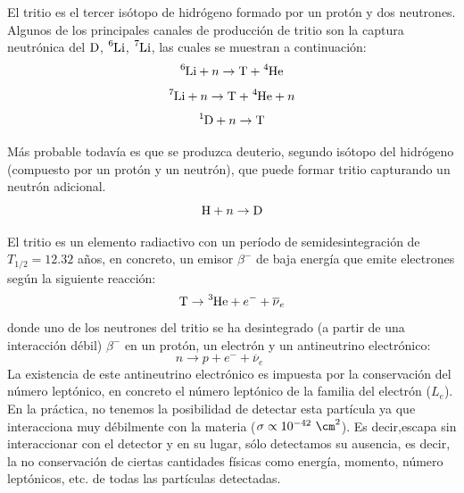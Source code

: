 El tritio  es el tercer isótopo de hidrógeno formado por un protón y dos neutrones. Algunos de los principales canales de producción de tritio son la captura neutrónica del $\ce{D}$, $\ce{^6Li}$, $\ce{^7Li}$,  las cuales se muestran a continuación:
\begin{equation}
\ce{^{6}Li} + n \rightarrow \ce{T} + \ce{^{4}He}
\label{capneuLi6}
\end{equation}
\begin{equation}
\ce{^{7}Li} + n \rightarrow  \ce{T} + \ce{^{4}He} + n
\label{capneuLi7}
\end{equation}
\begin{equation}
\ce{^{1}D} + n \rightarrow  \ce{T}  
\label{capneuH}
\end{equation}

Más probable todavía es que se produzca deuterio, segundo isótopo del hidrógeno (compuesto por un protón y un neutrón), que puede formar tritio capturando un neutrón adicional. 
\begin{equation}
\ce{H} + n \rightarrow  \ce{D}  
\label{capneuD}
\end{equation}


El tritio es  un elemento radiactivo con un período de semidesintegración de $T_{1/2}=12.32$ años, en concreto, un emisor $\beta^-$ de baja energía que emite electrones según la siguiente reacción:
\begin{equation}
\ce{T} \rightarrow \ce{^{3}He} + e^- + \overline{\nu}_e
\label{desintegraciontritio}
\end{equation}
donde  uno de los neutrones del tritio se ha desintegrado (a partir de una interacción débil)  $\beta^-$ en un protón, un electrón y un antineutrino electrónico:
\begin{equation}
n \rightarrow p + e^- + \overline{\nu}_e \qquad 
\label{desintegracionbeta}
\end{equation}
La existencia de este antineutrino electrónico es impuesta por la conservación del número leptónico, en concreto el número leptónico de la familia del electrón ($L_e$). En la práctica, no tenemos la posibilidad de detectar esta partícula ya que interacciona muy débilmente con la materia ($\sigma \propto 10^{-42}~\cm^2$).  Es decir,escapa sin interaccionar con el detector y en su lugar, sólo detectamos su ausencia, es decir, la no conservación de ciertas cantidades físicas como energía, momento, número leptónicos, etc. de todas  las partículas detectadas.

